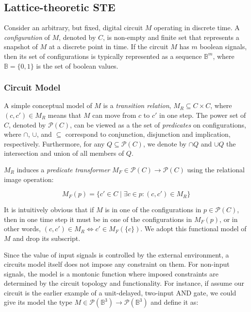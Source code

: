 \subsection{Lattice-theoretic STE}

Consider an arbitrary, but fixed, digital circuit $M$ operating in discrete time. A \textit{configuration} of $M$, denoted by $C$, is non-empty and finite set that represents a snapshot of $M$ at a discrete point in time. If the circuit $M$ has $m$ boolean signals, then its set of configurations is typically represented as a sequence $\mathbb{B}^{m}$, where $\mathbb{B} = \{ 0,1 \}$ is the set of boolean values.

\subsubsection{Circuit Model} A simple conceptual model of $M$ is a \textit{transition relation}, $M_{R} \subseteq C \times C$, where $(c,c') \in M_{R}$ means that $M$ can move from $c$ to $c'$ in one step\footnotemark. The power set of $C$, denoted by $\mathcal{P}(C)$, can be viewed as a the set of \textit{predicates} on configurations, where $\cap$, $\cup$, and $\subseteq$ correspond to conjunction, disjunction and implication, respectively. Furthermore, for any $Q \subseteq \mathcal{P}(C)$, we denote by $\cap Q$ and $\cup Q$ the intersection and union of all members of $Q$.


$M_{R}$ induces a \textit{predicate transformer} $M_{F} \in \mathcal{P}(C) \rightarrow \mathcal{P}(C)$ using the relational image operation:

\begin{equation*}
M_{F}(p) = \{ c' \in C \mid \exists c \in p : (c,c') \in M_{R} \}
\end{equation*}

\noindent It is intuitively obvious that if $M$ is in one of the configurations in $p \in \mathcal{P}(C)$, then in one time step it must be in one of the configurations in $M_{F}(p)$, or in other words, $(c,c') \in M_{R} \iff c' \in M_{F}(\{ c \})$. We adopt this functional model of $M$ and drop its subscript.

Since the value of input signals is controlled by the external environment, a circuits model itself does not impose any constraint on them. For non-input signals, the model is a montonic function where imposed constraints are determined by the circuit topology and functionality. For instance, if assume our circuit is the earlier example of a unit-delayed, two-input AND gate, we could give its model the type $M \in \mathcal{P}(\mathbb{B}^{3}) \rightarrow \mathcal{P}(\mathbb{B}^{3})$ and define it as:

